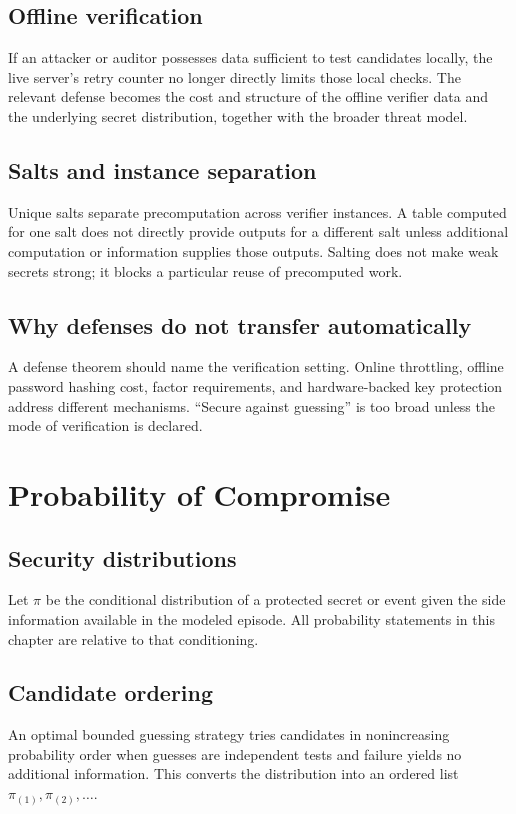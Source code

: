 \documentclass[11pt,oneside]{book}
\theoremstyle{definition}
\theoremstyle{remark}
\begin{document}
\section{Offline verification}
If an attacker or auditor possesses data sufficient to test candidates locally, the live server's retry counter no longer directly limits those local checks. The relevant defense becomes the cost and structure of the offline verifier data and the underlying secret distribution, together with the broader threat model.

\section{Salts and instance separation}
Unique salts separate precomputation across verifier instances. A table computed for one salt does not directly provide outputs for a different salt unless additional computation or information supplies those outputs. Salting does not make weak secrets strong; it blocks a particular reuse of precomputed work.

\section{Why defenses do not transfer automatically}
A defense theorem should name the verification setting. Online throttling, offline password hashing cost, factor requirements, and hardware-backed key protection address different mechanisms. ``Secure against guessing'' is too broad unless the mode of verification is declared.

\chapter{Probability of Compromise}
\label{ch:prob-compromise}
\section{Security distributions}
Let $\pi$ be the conditional distribution of a protected secret or event given the side information available in the modeled episode. All probability statements in this chapter are relative to that conditioning.

\section{Candidate ordering}
An optimal bounded guessing strategy tries candidates in nonincreasing probability order when guesses are independent tests and failure yields no additional information. This converts the distribution into an ordered list $\pi_{(1)},\pi_{(2)},\ldots$.
\end{document}

